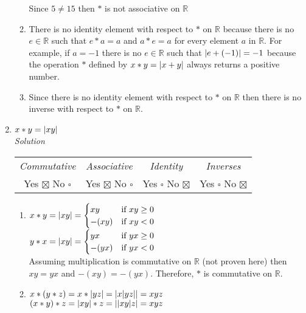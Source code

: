 \documentclass[12pt]{article}
\DeclarePairedDelimiter{\abs}{\lvert}{\rvert}
\begin{document}
\begin{enumerate}
\begin{enumerate}
                  Since $5 \neq 15$ then $*$ is not associative on $\mathbb{R}$
                \item There is no identity element with respect to $*$ on $\mathbb{R}$ because there 
                  is no $e \in \mathbb{R}$ such that $e * a = a$ and $a * e = a$ for every element 
                  $a$ in $\mathbb{R}$. For example, if $a = -1$ there is no $e \in \mathbb{R}$ such 
                  that $\abs{e + (-1)} = -1$ because the operation $*$ defined by $x * y = \abs{ x + y }$ 
                  always returns a positive number.  
                \item Since there is no identity element with respect to $*$ on $\mathbb{R}$ then there 
                  is no inverse with respect to $*$ on $\mathbb{R}$.
              \end{enumerate}
          \item $x * y = \abs{ xy }$ \\
            \medskip
            \textit{Solution}
            \medskip
            \begin{tabular}{c c c c}
              \textit{Commutative} & \textit{Associative} & \textit{Identity} & \textit{Inverses} \\
              Yes $\boxtimes$ No $\square$ & Yes $\boxtimes$ No $\square$ & Yes $\square$ No $\boxtimes$ & Yes $\square$ No $\boxtimes$ \\
            \end{tabular}
            \begin{enumerate}
              \item $x * y = \abs{xy}  = \begin{cases} xy &\mbox{if } xy \geq 0 \\ -(xy) &\mbox{if } xy < 0\end{cases} $ \\
                $y * x = \abs{xy}  = \begin{cases} yx &\mbox{if } yx \geq 0 \\ -(yx) &\mbox{if } yx < 0\end{cases} $ \\
                Assuming multiplication is commutative on $\mathbb{R}$ (not proven here) then $xy = yx$ and $-(xy) = -(yx)$. 
                Therefore, $*$ is commutative on $\mathbb{R}$.
              \item $ x * (y * z) = x * \abs{yz} = \abs{x \abs{yz}} = xyz$ \\
                $ (x * y) * z = \abs{xy} * z = \abs{\abs{xy}z} = xyz$ \\

\end{enumerate}
\end{enumerate}
\end{document}
